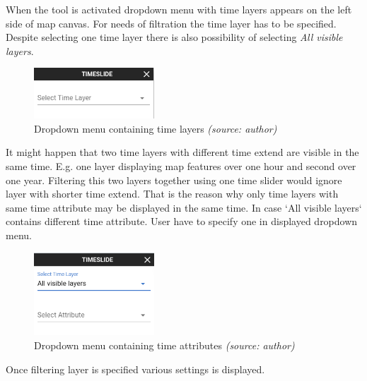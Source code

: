 \bigskip
When the tool is activated dropdown menu with time layers appears on 
the left side of map canvas. For needs of filtration the time layer 
has to be specified. Despite selecting one time layer there is
also possibility of selecting \textit{All visible layers}.

\begin{figure}[h!]
	\centering
	\includegraphics[width=0.4\textwidth]{./img/time-layers-dropdown.png}
	\caption{Dropdown menu containing time layers \textit{(source: author)}}
	\label{fig:time-layers-drpdown}
\end{figure}

\bigskip
It might happen that two time layers with different time extend are 
visible in the same time. E.g. one layer displaying map features 
over one hour and second over one year. Filtering this two layers 
together using one time slider would ignore layer with shorter time 
extend. That is the reason why only time layers with same time 
attribute may be displayed in the same time. In case `All visible 
layers` contains different time attribute. User have to specify one 
in displayed dropdown menu.

\begin{figure}[h!]
	\centering
	\includegraphics[width=0.4\textwidth]{./img/time-attribute-dropdown.png}
	\caption{Dropdown menu containing time attributes \textit{(source: author)}}
	\label{fig:time-attribute-dropdown}
\end{figure}

\newpage
Once filtering layer is specified various settings is displayed. 

